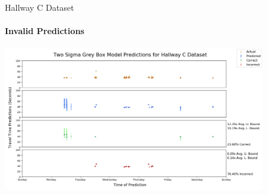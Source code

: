 \documentclass{beamer}
\begin{document}
%
%
%
%
%
%



\begin{frame}[t]{Hallway C Dataset}
  \framesubtitle{Invalid Predictions}

  {\includegraphics[width = 4.5in]{images/hallway/two_sigma_grey_box_model_predictions_for_hallway_c_dataset.png}}

\end{frame}
\end{document}
